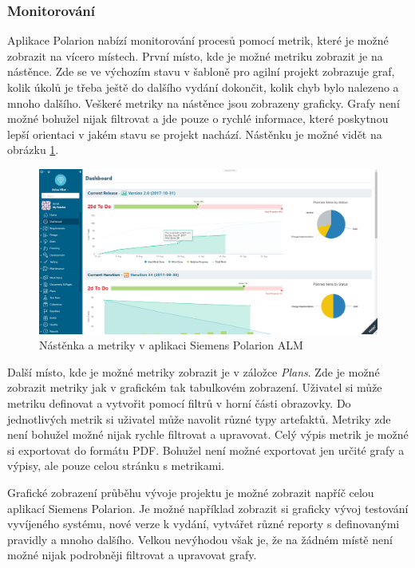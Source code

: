 \documentclass[czech,master,public,dept460,male,cpdeclaration,oneside]{diploma}
\begin{document}
\subsubsection{Monitorování}
Aplikace Polarion nabízí monitorování procesů pomocí metrik, které je možné zobrazit na vícero místech. První místo, kde je možné metriku zobrazit je na nástěnce. Zde se ve výchozím stavu v šabloně pro agilní projekt zobrazuje graf, kolik úkolů je třeba ještě do dalšího vydání dokončit, kolik chyb bylo nalezeno a mnoho dalšího. Veškeré metriky na nástěnce jsou zobrazeny graficky. Grafy není možné bohužel nijak filtrovat a jde pouze o rychlé informace, které poskytnou lepší orientaci v jakém stavu se projekt nachází. Nástěnku je možné vidět na obrázku \ref{fig:polarion_dashboard}.

\begin{figure}[!ht]
    \centering
    \includegraphics[width=1\textwidth]{Diplomka/Figures/polarion_dashboard.png}
    \caption{Nástěnka a metriky v aplikaci Siemens Polarion ALM}
    \label{fig:polarion_dashboard}
\end{figure}

Další místo, kde je možné metriky zobrazit je v záložce \textit{Plans}. Zde je možné zobrazit metriky jak v grafickém tak tabulkovém zobrazení. Uživatel si může metriku definovat a vytvořit pomocí filtrů v horní části obrazovky. Do jednotlivých metrik si uživatel může navolit různé typy artefaktů. Metriky zde není bohužel možné nijak rychle filtrovat a upravovat. Celý výpis metrik je možné si exportovat do formátu PDF. Bohužel není možné exportovat jen určité grafy a výpisy, ale pouze celou stránku s metrikami.

Grafické zobrazení průběhu vývoje projektu je možné zobrazit napříč celou aplikací Siemens Polarion. Je možné například zobrazit si graficky vývoj testování vyvíjeného systému, nové verze k vydání, vytvářet různé reporty s definovanými pravidly a mnoho dalšího. Velkou nevýhodou však je, že na žádném místě není možné nijak podrobněji filtrovat a upravovat grafy.
\end{document}
